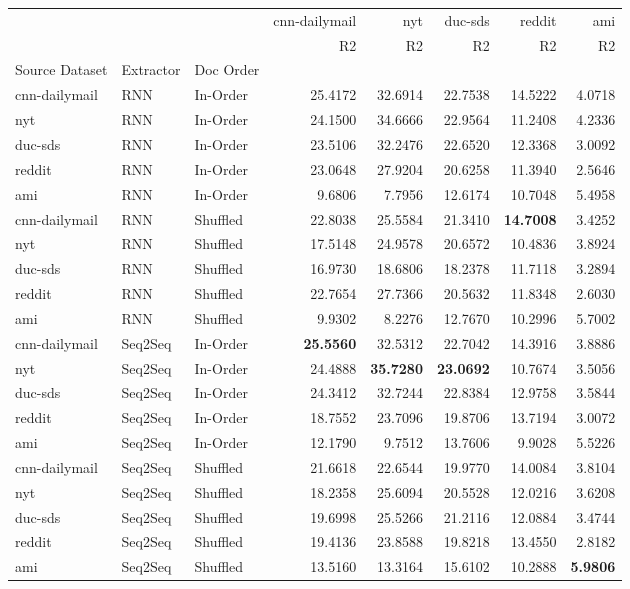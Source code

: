\begin{table*}
\begin{tabular}{lllrrrrr}
    &     &          & cnn-dailymail &      nyt &  duc-sds &   reddit &     ami \\
    &     &          &            R2 &       R2 &       R2 &       R2 &      R2 \\
Source Dataset & Extractor & Doc Order &               &          &          &          &         \\
cnn-dailymail & RNN & In-Order &       25.4172 &  32.6914 &  22.7538 &  14.5222 &  4.0718 \\
nyt & RNN & In-Order &       24.1500 &  34.6666 &  22.9564 &  11.2408 &  4.2336 \\
duc-sds & RNN & In-Order &       23.5106 &  32.2476 &  22.6520 &  12.3368 &  3.0092 \\
reddit & RNN & In-Order &       23.0648 &  27.9204 &  20.6258 &  11.3940 &  2.5646 \\
ami & RNN & In-Order &        9.6806 &   7.7956 &  12.6174 &  10.7048 &  5.4958 \\
cnn-dailymail & RNN & Shuffled &       22.8038 &  25.5584 &  21.3410 &  \textbf{14.7008} &  3.4252 \\
nyt & RNN & Shuffled &       17.5148 &  24.9578 &  20.6572 &  10.4836 &  3.8924 \\
duc-sds & RNN & Shuffled &       16.9730 &  18.6806 &  18.2378 &  11.7118 &  3.2894 \\
reddit & RNN & Shuffled &       22.7654 &  27.7366 &  20.5632 &  11.8348 &  2.6030 \\
ami & RNN & Shuffled &        9.9302 &   8.2276 &  12.7670 &  10.2996 &  5.7002 \\
cnn-dailymail & Seq2Seq & In-Order &       \textbf{25.5560} &  32.5312 &  22.7042 &  14.3916 &  3.8886 \\
nyt & Seq2Seq & In-Order &       24.4888 &  \textbf{35.7280} &  \textbf{23.0692} &  10.7674 &  3.5056 \\
duc-sds & Seq2Seq & In-Order &       24.3412 &  32.7244 &  22.8384 &  12.9758 &  3.5844 \\
reddit & Seq2Seq & In-Order &       18.7552 &  23.7096 &  19.8706 &  13.7194 &  3.0072 \\
ami & Seq2Seq & In-Order &       12.1790 &   9.7512 &  13.7606 &   9.9028 &  5.5226 \\
cnn-dailymail & Seq2Seq & Shuffled &       21.6618 &  22.6544 &  19.9770 &  14.0084 &  3.8104 \\
nyt & Seq2Seq & Shuffled &       18.2358 &  25.6094 &  20.5528 &  12.0216 &  3.6208 \\
duc-sds & Seq2Seq & Shuffled &       19.6998 &  25.5266 &  21.2116 &  12.0884 &  3.4744 \\
reddit & Seq2Seq & Shuffled &       19.4136 &  23.8588 &  19.8218 &  13.4550 &  2.8182 \\
ami & Seq2Seq & Shuffled &       13.5160 &  13.3164 &  15.6102 &  10.2888 &  \textbf{5.9806} \\
\end{tabular}



\end{table*}

